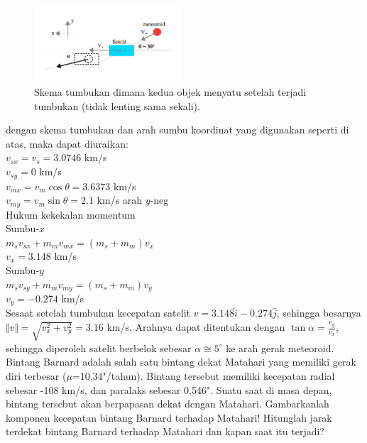 \documentclass[11pt,fleqn]{exam}
\begin{document}
\begin{questions}
\begin{figure}[H]
\centering
\includegraphics[width=0.49\textwidth]{satelit_meteoroid.png}
\caption{Skema tumbukan dimana kedua objek menyatu setelah terjadi tumbukan (tidak lenting sama sekali).}
\label{overflow}
\end{figure}

dengan skema tumbukan dan arah sumbu koordinat yang digunakan seperti di atas, maka dapat diuraikan:\\
$v_{sx} = v_s = 3.0746$ km/s\\
$v_{sy} = 0$ km/s\\
$v_{mx} = v_m \cos \theta = 3.6373$ km/s\\
$v_{my} = v_m \sin \theta = 2.1$ km/s arah $y$-neg\\

Hukum kekekalan momentum\\
Sumbu-$x$\\
$m_{s}v_{sx} + m_{m}v_{mx} = (m_{s} + m_{m})v_{x}$\\
$v_x = 3.148$ km/s\\

Sumbu-$y$\\
$m_{s}v_{sy} + m_{m}v_{my} = (m_{s} + m_{m})v_{y}$\\
$v_y = -0.274$ km/s\\

Sesaat setelah tumbukan kecepatan satelit $v = 3.148\hat{i} - 0.274\hat{j}$, sehingga besarnya $\Vert v \Vert = \sqrt{v_x^2 + v_y^2} = 3.16$ km/s. Arahnya dapat ditentukan dengan $\tan \alpha = \frac{v_y}{v_x}$, sehingga diperoleh satelit berbelok sebesar $ \alpha \cong 5^{\circ}$ ke arah gerak meteoroid.\\

\question Bintang Barnard adalah salah satu bintang dekat Matahari yang memiliki gerak diri terbesar ($\mu$=10,34"/tahun). Bintang tersebut memiliki kecepatan radial sebesar -108 km/s, dan paralaks sebesar 0,546". Suatu saat di masa depan, bintang tersebut akan berpapasan dekat dengan Matahari. Gambarkanlah komponen kecepatan bintang Barnard terhadap Matahari! Hitunglah jarak terdekat bintang Barnard terhadap Matahari dan kapan saat itu terjadi?


\end{questions}
\end{document}
